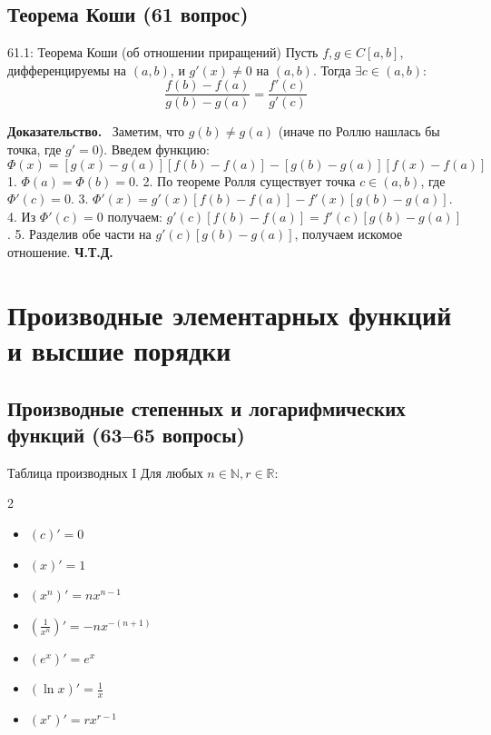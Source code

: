 \documentclass[a4paper,12pt]{article}
\newcommand{\myproof}{\textbf{Доказательство.}\ }
\begin{document}
	
	
	\newpage
	\subsection{Теорема Коши (61 вопрос)}
	
	\begin{theorembox}{61.1: Теорема Коши (об отношении приращений)}
		Пусть $f, g \in C[a, b]$, дифференцируемы на $(a, b)$, и $g'(x) \neq 0$ на $(a, b)$. Тогда $\exists c \in (a, b)$:
		$$ \frac{f(b) - f(a)}{g(b) - g(a)} = \frac{f'(c)}{g'(c)} $$
	\end{theorembox}
	
	\myproof
	Заметим, что $g(b) \neq g(a)$ (иначе по Роллю нашлась бы точка, где $g'=0$). Введем функцию:
	$$ \Phi(x) = [g(x) - g(a)][f(b) - f(a)] - [g(b) - g(a)][f(x) - f(a)] $$
	1. $\Phi(a) = \Phi(b) = 0$.
	2. По теореме Ролля существует точка $c \in (a, b)$, где $\Phi'(c) = 0$.
	3. $\Phi'(x) = g'(x)[f(b) - f(a)] - f'(x)[g(b) - g(a)]$.
	4. Из $\Phi'(c) = 0$ получаем: $g'(c)[f(b) - f(a)] = f'(c)[g(b) - g(a)]$.
	5. Разделив обе части на $g'(c)[g(b) - g(a)]$, получаем искомое отношение. \textbf{Ч.Т.Д.}
	
	
	
	
	
	
	
	
	\newpage
	\section{Производные элементарных функций и высшие порядки}
	
	\subsection{Производные степенных и логарифмических функций (63--65 вопросы)}
	
	\begin{theorembox}{Таблица производных I}
		Для любых $n \in \mathbb{N}, r \in \mathbb{R}$:
		\begin{multicols}{2}
			\begin{itemize}
				\item $(c)' = 0$
				\item $(x)' = 1$
				\item $(x^n)' = n x^{n-1}$
				\item $(\frac{1}{x^n})' = -n x^{-(n+1)}$
				\item $(e^x)' = e^x$
				\item $(\ln x)' = \frac{1}{x}$
				\item $(x^r)' = r x^{r-1}$
			\end{itemize}
		\end{multicols}
	\end{theorembox}
	
\end{document}
